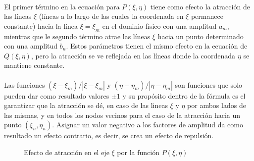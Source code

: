 \documentclass[letterpaper, openright, 12pt]{book}
\begin{document}
    \paragraph*{}
    El primer término en la ecuación para $P(\xi, \eta)$ tiene como efecto
    la atracción de las líneas $\xi$ (líneas a lo largo de las cuales la
    coordenada en $\xi$ permanece constante) hacia la línea $\xi = \xi_{m}$
    en el dominio físico con una amplitud $a_{m}$, mientras que le segundo
    término atrae las líneas $\xi$ hacia un punto determinado con una
    amplitud $b_{n}$. Estos parámetros tienen el mismo efecto en la ecuación
    de $Q(\xi, \eta)$, pero la atracción se ve reflejada en las líneas donde
    la coordenada $\eta$ se mantiene constante.

    \paragraph*{}
    Las funciones $(\xi - \xi_{m}) / |\xi - \xi_{m}|$ y
    $(\eta - \eta_{m}) / |\eta - \eta_{m}|$
    son funciones que solo pueden dar como resultado valores $\pm 1$ y su
    propósito dentro de la fórmula es el garantizar que la atracción se dé,
    en caso de las lineas $\xi$ y $\eta$ por ambos lados de las mismas, y en
    todos los nodos vecinos para el caso de la atracción hacia un punto
    $(\xi_{n}, \eta_{n})$. Asignar un valor negativo a los factores de
    amplitud da como resultado un efecto contrario, es decir, se crea un
    efecto de repulsión.
    \begin{figure}[htbp!]
        \centering
        \hspace{1cm}
        \caption[Efecto de atracción por función $P(\xi,\eta)$]{Efecto de
        atracción en el eje $\xi$ por la función $P(\xi, \eta)$}
        \label{fig:densidad-xi}
        \end{figure}
\end{document}
